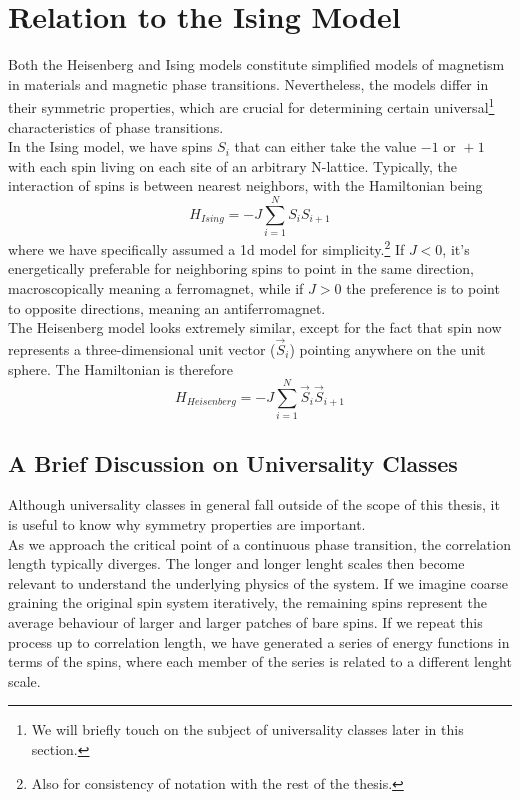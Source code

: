 \documentclass[../intro.tex,../../main.tex]{subfiles}
\begin{document}
\section{Relation to the Ising Model}


Both the Heisenberg and Ising models constitute simplified models of magnetism in materials and magnetic phase transitions. Nevertheless, the models differ in their symmetric properties, which are crucial for determining certain universal\footnote{We will briefly touch on the subject of universality classes later in this section.} characteristics of phase transitions.\\

In the Ising model, we have spins $S_{i}$ that can either take the value $-1 \text{ or }+1$ with each spin living on each site of an arbitrary N-lattice. Typically, the interaction of spins is between nearest neighbors, with the Hamiltonian being
\begin{equation}
    H_{Ising}=-J\sum_{i=1}^{N}S_{i}S_{i+1}
\end{equation}
where we have specifically assumed a 1d model for simplicity.\footnote{Also for consistency of notation with the rest of the thesis.} If $J<0$, it's energetically preferable for neighboring spins to point in the same direction, macroscopically meaning a ferromagnet, while if $J>0$ the preference is to point to opposite directions, meaning an antiferromagnet.\\

The Heisenberg model looks extremely similar, except for the fact that spin now represents a three-dimensional unit vector ($\vec{S}_{i}$) pointing anywhere on the unit sphere. The Hamiltonian is therefore 
\begin{equation}
    H_{Heisenberg}=-J\sum_{i=1}^{N}\vec{S}_{i}\vec{S}_{i+1}
\end{equation}

\subsection{A Brief Discussion on Universality Classes}

\hspace{\parindent} Although universality classes in general fall outside of the scope of this thesis, it is useful to know why symmetry properties are important.\\

As we approach the critical point of a continuous phase transition, the correlation length typically diverges. The longer and longer lenght scales then become relevant to understand the underlying physics of the system. If we imagine coarse graining the original spin system iteratively, the remaining spins represent the average behaviour of larger and larger patches of bare spins. If we repeat this process up to correlation length, we have generated a series of energy functions in terms of the spins, where each member of the series is related to a different lenght scale.\\
\end{document}
